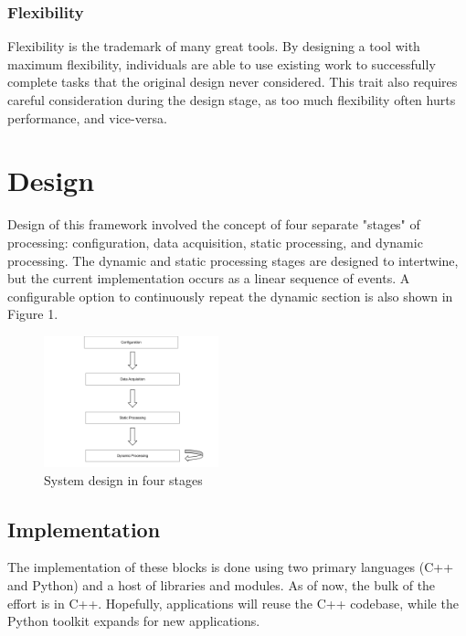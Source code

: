 \documentclass[journal]{IEEEtran}
\begin{document}
\subsubsection{Flexibility}
Flexibility is the trademark of many great tools. By designing a tool with maximum flexibility, individuals are able to use existing 
work to successfully complete tasks that the original design never considered. This trait also requires careful consideration during the design
stage, as too much flexibility often hurts performance, and vice-versa.

\section{Design}
Design of this framework involved the concept of four separate "stages" of processing: configuration, data acquisition, static processing, and 
dynamic processing. The dynamic and static processing stages are designed to intertwine, but the current implementation occurs as a 
linear sequence of events. A configurable option to continuously repeat the dynamic section is also shown in Figure 1.
\begin{figure}[h!]
\centering
  \includegraphics[width=0.45\textwidth]{fig1.png}
\caption{System design in four stages}
\end{figure}

\subsection{Implementation}
The implementation of these blocks is done using two primary languages (C++ and Python) and a host of libraries and modules. As of now, the bulk
of the effort is in C++. Hopefully, applications will reuse the C++ codebase, while the Python toolkit expands for new applications.
\end{document}
